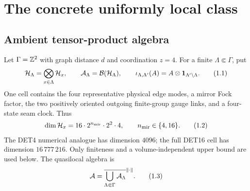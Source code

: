 
\maketitle

\begin{abstract}
We isolate the uniformly finite-dimensional, finite-range Hamiltonian class
actually assembled by the TFPT \(2+1\)- and \(3+1\)-dimensional probes:
electric and plaquette gauge terms, gauge-dressed fermion hopping, the
DET16 mirror projector, and the seam clock and charge terms.  At the frozen
\(2+1\)-dimensional coefficients the interaction has range \(R=2\), largest
local term \(J=12/5\), and interaction moment
\(\kappa=16043/450\).  A complete finite-range Lieb--Robinson argument gives
\[
 v_{\rm LR}=2e\kappa R=\frac{32086e}{225}
 =387.639069990831.
\]
We then prove in norm, rather than assume, that the finite-volume
Heisenberg dynamics form a Cauchy net on every local observable and hence
define a strongly continuous thermodynamic-limit automorphism group.
Gauss constraints are handled on the gauge-invariant subalgebra of the
ambient quasilocal algebra; naive embeddings of projected physical Hilbert
spaces are neither needed nor asserted.  Weak-* compactness gives at least
one ground state and, for each positive inverse temperature, at least one
KMS state.  The numeric twin passes all eight checks and measures velocity
\(2.0\), well below the proved class bound.
\end{abstract}

\tableofcontents

\section{The concrete uniformly local class}

\subsection{Ambient tensor-product algebra}

Let \(\Gamma=\mathbb Z^2\) with graph distance \(d\) and coordination \(z=4\).
For a finite \(\Lambda\Subset\Gamma\), put
\[
 \mathcal H_\Lambda=\bigotimes_{x\in\Lambda}\mathcal H_x,\qquad
 \mathcal A_\Lambda=\mathcal B(\mathcal H_\Lambda),
 \qquad
 \iota_{\Lambda,\Lambda'}(A)=A\otimes\mathbf 1_{\Lambda'\setminus\Lambda}.
\tag{1.1}\label{eq:ambient}
\]
One cell contains the four representative physical edge modes, a mirror
Fock factor, the two positively oriented outgoing finite-group gauge links,
and a four-state seam clock.  Thus
\[
 \dim\mathcal H_x=16\cdot 2^{n_{\rm mir}}\cdot 2^2\cdot4,
 \qquad n_{\rm mir}\in\{4,16\}.
\tag{1.2}\label{eq:localdim}
\]
The DET4 numerical analogue has dimension \(4096\); the full DET16 cell has
dimension \(16\,777\,216\).  Only finiteness and a volume-independent upper
bound are used below.  The quasilocal algebra is
\[
 \mathcal A=\overline{\bigcup_{\Lambda\Subset\Gamma}\mathcal A_\Lambda}^{\left\lVert\cdot\right\rVert}.
\tag{1.3}\label{eq:quasilocal}
\]


